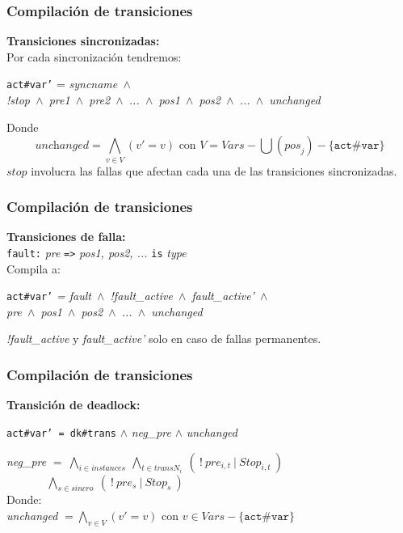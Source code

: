 \documentclass[serif]{beamer}
\begin{document}
\begin{frame}
\frametitle{Compilación de transiciones}
\textbf{\Large Transiciones sincronizadas:}\\[0.3cm]
Por cada sincronizaci\'on tendremos:
\begin{framed}
\texttt{act\#var'} = \textit{syncname~$\wedge$~\\!stop~$\wedge$~pre1~$\wedge$~pre2~$\wedge$~...$
$~$\wedge$~pos1~$\wedge$~pos2~$\wedge$~...~$\wedge$~unchanged}\\[0.3cm]
\end{framed}
Donde
$$\textit{unchanged} = \bigwedge_{v \in V}(v' = v) \text{ con }V = \textit{Vars} 
- \bigcup (\textit{pos}_j) - \{\texttt{act\#var}\}$$
$stop$ involucra las fallas que afectan cada una de las 
transiciones sincronizadas.
\end{frame}


\begin{frame}
\frametitle{Compilación de transiciones}
\textbf{\Large Transiciones de falla:}\\[0.3cm]
\texttt{fault:} \textit{pre} \texttt{=>} \textit{pos1, pos2, ...} \texttt{is} \textit{type}\\[0.3cm]
Compila a:
\begin{framed}
\texttt{act\#var'} \textit{= fault~$\wedge$~!fault\_active~$\wedge$~fault\_active'~$\wedge$~\\pre~$\wedge$~pos1~$\wedge$~pos2~$\wedge$~...~$\wedge$~unchanged}
\end{framed}
\textit{!fault\_active} y \textit{fault\_active'} solo en caso de fallas permanentes.
\end{frame}


\begin{frame}
\frametitle{Compilación de transiciones}
\textbf{\Large Transición de deadlock:}\\[0.3cm]
\begin{framed}
\texttt{act\#var' = dk\#trans} $\wedge$ \textit{neg\_pre} $\wedge$ \textit{unchanged}
\end{framed}
\textit{neg\_pre} $=~\bigwedge_{i \in instances}~\bigwedge_{t \in transN_i}~(~!~pre_{i,t}~|~Stop_{i,t}~)$\\[0.3cm]
$~~~~~~~~~~~~~~~~\bigwedge_{s \in sincro}~(~!~pre_s~|~Stop_s~)$\\[0.3cm]
Donde:\\[0.3cm]
\textit{unchanged} $= \bigwedge_{v \in V}(v' = v) \text{ con } v \in \textit{Vars} - \{\texttt{act\#var}\}$
\end{frame}
\end{document}

